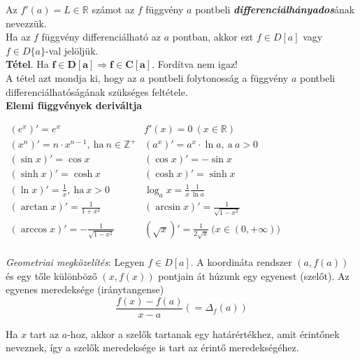 \documentclass[12pt,margin=0px]{article}
\newcommand\ddfrac[2]{\frac{\displaystyle #1}{\displaystyle #2}}
\begin{document}
    \noindent Az $f'(a) = L \in \mathbb{R}$ számot az $f$ függvény $a$ pontbeli \textbf{\emph{differenciálhányados}}ának nevezzük.\\

    \noindent Ha az $f$ függvény differenciálható az $a$ pontban, akkor ezt $f \in D[a]$ vagy $f \in D\{a\}$-val jelöljük.\\

    \noindent \textbf{Tétel}. Ha $\boldsymbol{f \in D[a] \Rightarrow f \in C[a]}$. Fordítva nem igaz!\\

    \noindent A tétel azt mondja ki, hogy az $a$ pontbeli folytonosság a függvény $a$ pontbeli differenciálhatóságának szükséges feltétele.\\

    \noindent \textbf{Elemi függvények deriváltja}
    \begin{center}
    \renewcommand{\arraystretch}{1.5}

    $\begin{array}{l|l}
      (e^x)' = e^{x} & f'(x) = 0\ (x \in \mathbb{R}) \\ \hline
      (x^{n})' = n \cdot x^{n-1},\ \text{ha}\ n \in \mathbb{Z}^{+} & (a^{x})' = a^{x} \cdot \ln a,\ \text{a}\ a > 0 \\ \hline
      (\sin x)'= \cos x & (\cos x)'= -\sin x \\ \hline
      (\sinh x)' = \cosh x & (\cosh x)' = \sinh x \\ \hline
      (\ln x)' = \ddfrac{1}{x},\ \text{ha}\ x > 0 & \log_{a}x = \ddfrac{1}{x} \ddfrac{1}{\ln a} \\ \hline
      (\arctan x)' = \ddfrac{1}{1 + x^2} & (\arcsin x)' = \ddfrac{1}{\sqrt{1 - x^2}} \\ \hline
      (\arccos x)' = -\ddfrac{1}{\sqrt{1 - x^2}} & (\sqrt{x})' = \ddfrac{1}{2\sqrt{x}}\ \big(x \in (0, +\infty)\big) \\
    \end{array}$
    \renewcommand{\arraystretch}{1}
    \end{center}

    \noindent \emph{Geometriai megközelítés}: Legyen $f \in D[a]$. A koordináta rendszer $(a, f(a))$ és egy tőle különböző $(x, f(x))$ pontjain át húzunk egy egyenest (szelőt). Az egyenes meredeksége (iránytangense)
    \[
        \ddfrac{f(x) - f(a)}{x - a} (=\Delta_f(a))
    \]

    \noindent Ha $x$ tart az $a$-hoz, akkor a szelők tartanak egy határértékhez, amit érintőnek neveznek, így a szelők meredeksége is tart az érintő meredekségéhez.\\
\end{document}
